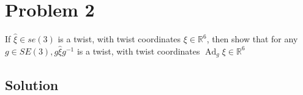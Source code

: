 \section*{Problem 2}

If \( \widehat{\xi} \in s e(3) \) is a twist, with twist coordinates \( \xi \in \mathbb{R}^{6} \), then show that for any \( g \in S E(3), g \widehat{\xi} g^{-1} \) is a twist, with twist coordinates \( \operatorname{Ad}_{g} \xi \in \mathbb{R}^{6} \)

\subsection*{Solution}
